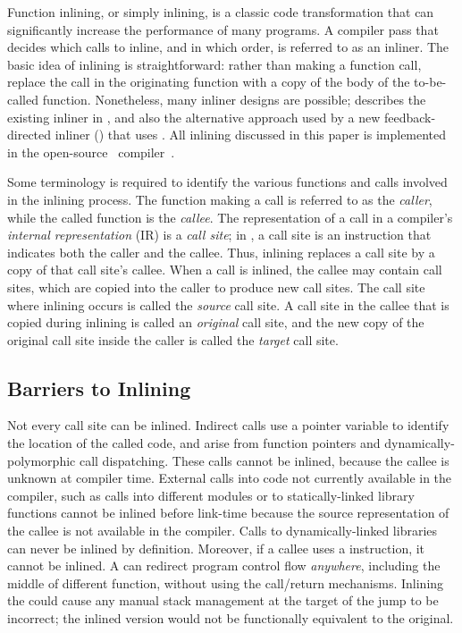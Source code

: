 
Function inlining, or simply inlining, is a classic code
transformation that can significantly increase the performance of many
programs.  A compiler pass that decides which calls to inline, and in
which order, is referred to as an inliner.  The basic idea of inlining
is straightforward: rather than making a function call, replace the
call in the originating function with a copy of the body of the
to-be-called function.  Nonetheless, many inliner designs are
possible; \cite{BerubePhD} describes the existing inliner
in \llvm, and also the alternative
approach used by a new feedback-directed inliner (\FDI) that uses \CP.
All inlining discussed in this paper is implemented in the
open-source \llvm\ compiler~\cite{LattnerAdveCGO04}.

Some terminology is required to identify the various functions and
calls involved in the inlining process.  The function making a call is
referred to as the {\it caller}, while the called function is the {\it
callee}.  The representation of a call in a compiler's {\it internal
representation} (IR) is a {\it call site}; in \llvm, a call site is an
instruction that indicates both the caller and the callee.  Thus,
inlining replaces a call site by a copy of that call site's callee.
When a call is inlined, the callee may contain call sites, which are
copied into the caller to produce new call sites.  The call site where
inlining occurs is called the {\it source} call site.  A call site in
the callee that is copied during inlining is called an {\it original}
call site, and the new copy of the original call site inside the
caller is called the {\it target} call site.

\subsection{Barriers to Inlining}

Not every call site can be inlined.  Indirect calls use a pointer
variable to identify the location of the called code, and arise from
function pointers and dynamically-polymorphic call dispatching.  These
calls cannot be inlined, because the callee is unknown at compiler
time.  External calls into code not currently available in the
compiler, such as calls into different modules or to statically-linked
library functions cannot be inlined before link-time because the
source representation of the callee is not available in the compiler.
Calls to dynamically-linked libraries can never be inlined by
definition. Moreover, if a callee uses a  instruction,
it cannot be inlined. A  can redirect program control
flow {\it anywhere}, including the middle of different function,
without using the call/return mechanisms.  Inlining the 
could cause any manual stack management at the target of the jump to be
incorrect; the inlined version would not be functionally equivalent to
the original.

